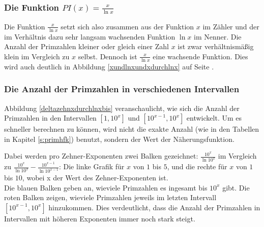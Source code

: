 \begin{refsegment}
\subsubsection*{Die Funktion $PI(x) = \frac{x}{\ln{x}}$}
Die Funktion $\frac{x}{\ln{x}}$ setzt sich also zusammen aus der Funktion $x$ im Zähler und der im Verhältnis dazu sehr langsam wachsenden Funktion $\ln{x}$ im Nenner. Die Anzahl der Primzahlen kleiner oder gleich einer Zahl $x$ ist zwar verhältnismäßig klein im Vergleich zu $x$ selbst. Dennoch ist $\frac{x}{\ln{x}}$ eine wachsende Funktion. Dies wird auch deutlich in Abbildung \ref{xundlnxundxdurchlnx} auf Seite \pageref{xundlnxundxdurchlnx}.


\subsubsection*{Die Anzahl der Primzahlen in verschiedenen Intervallen}
\label{primes:_Appendix_subsubsection_NumberofPrimes-in-intervals}
Abbildung \ref{deltazehnxdurchlnxbis}
veranschaulicht, wie sich die Anzahl der Primzahlen in den Intervallen
$[1, 10^x]$ und $[10^{x-1},10^{x}]$ entwickelt. Um es schneller
berechnen zu können, wird
nicht die exakte Anzahl (wie in den Tabellen in Kapitel \ref{s:primhfk})
benutzt, sondern der Wert der Näherungsfunktion.

Dabei werden pro Zehner-Exponenten zwei Balken gezeichnet:
$\frac{10^{x}}{\ln{10^{x}}}$ im Vergleich zu $\frac{10^{x}}{\ln{10^{x}}}-\frac{10^{x-1}}{\ln{10^{x-1}}}$:
Die linke Grafik für $x$ von $1$ bis $5$, und die rechte für $x$ von $1$ bis $10$, wobei x der Wert des Zehner-Exponenten ist.\\

Die blauen Balken geben an, wieviele Primzahlen es ingesamt bis $10^x$ gibt.
Die roten Balken zeigen, wieviele Primzahlen jeweils im letzten Intervall
$[10^{x-1},10^x]$ hinzukommen.
Dies verdeutlicht, dass die Anzahl der Primzahlen in Intervallen mit höheren
Exponenten immer noch stark steigt.


\end{refsegment}
